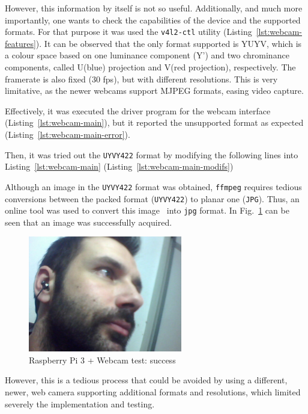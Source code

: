 However, this information by itself is not so useful. Additionally, and much
more importantly, one wants to check the capabilities of the device and the
supported formats. For that purpose it was used the \texttt{v4l2-ctl} utility
(Listing~\ref{lst:webcam-features}). It can be observed that the only format
supported is YUYV, which is a colour space based on one luminance component (Y')
and two chrominance components, called U(blue) projection and V(red projection),
respectively. The framerate is also fixed (30 fps), but with different
resolutions. This is very limitative, as the newer webcams support MJPEG
formats, easing video capture.
%

Effectively, it was executed the driver program for the webcam interface
(Listing~\ref{lst:webcam-main}), but it reported the unsupported format as
expected (Listing~\ref{lst:webcam-main-error}).
%

Then, it was tried out the \texttt{UYVY422} format by modifying the following
lines into Listing~\ref{lst:webcam-main}
(Listing~\ref{lst:webcam-main-modifs})
%

Although an image in the \texttt{UYVY422} format was obtained, \texttt{ffmpeg}
requires tedious conversions between the packed format (\texttt{UYVY422}) to
planar one (\texttt{JPG}). Thus, an online tool was used to convert this image~\cite{conv-UYVY-jpg} into \texttt{jpg} format. In Fig.~\ref{fig:rasp-cam-test-succ} can be seen that an image was
successfully acquired.
\begin{figure}[!hbt]
\centering
    \includegraphics[width=0.6\textwidth]{./img/webcam-test-success.jpg}
  \caption{Raspberry Pi 3 + Webcam test: success}%
\label{fig:rasp-cam-test-succ}
\end{figure}

However, this is a tedious process that could be avoided by using a different,
newer, web camera supporting additional formats and resolutions, which limited
severely the implementation and testing.
%
